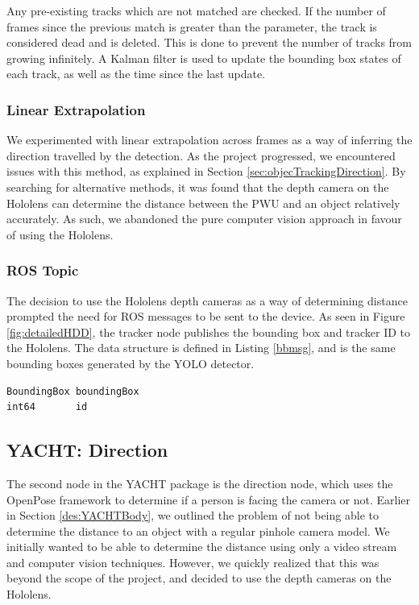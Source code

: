 Any pre-existing tracks which are not matched are checked. If the number of frames since the previous match is greater than the  parameter, the track is considered dead and is deleted. This is done to prevent the number of tracks from growing infinitely. A Kalman filter is used to update the bounding box states of each track, as well as the time since the last update.
 
\subsubsection{Linear Extrapolation}
We experimented with linear extrapolation across frames as a way of inferring the direction travelled by the detection. As the project progressed, we encountered issues with this method, as explained in Section \ref{sec:objecTrackingDirection}. By searching for alternative methods, it was found that the depth camera on the Hololens can determine the distance between the PWU and an object relatively accurately. As such, we abandoned the pure computer vision approach in favour of using the Hololens.

\subsubsection{ROS Topic} \label{sec:yachtTrackROS}
The decision to use the Hololens depth cameras as a way of determining distance prompted the need for ROS messages to be sent to the device. As seen in Figure \ref{fig:detailedHDD}, the tracker node publishes the bounding box and tracker ID to the Hololens. The  data structure is defined in Listing \ref{bbmsg}, and is the same bounding boxes generated by the YOLO detector.

\begin{lstlisting}[language=Mymatlab,caption={ROS message structure for BoundingBoxID.msg}]
BoundingBox boundingBox
int64       id
\end{lstlisting}

\subsection{YACHT: Direction}
The second node in the YACHT package is the direction node, which uses the OpenPose framework to determine if a person is facing the camera or not. Earlier in Section \ref{des:YACHTBody}, we outlined the problem of not being able to determine the distance to an object with a regular pinhole camera model. We initially wanted to be able to determine the distance using only a video stream and computer vision techniques. However, we quickly realized that this was beyond the scope of the project, and decided to use the depth cameras on the Hololens.

